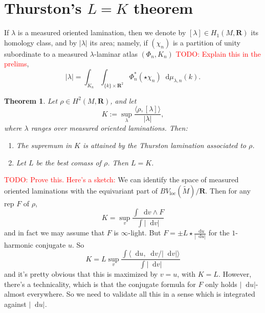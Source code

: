\documentclass[reqno,11pt]{amsart}
\newcommand{\RR}{\mathbf{R}}
\newcommand*\dif{\mathop{}\!\mathrm{d}}
\newcommand{\loc}{\mathrm{loc}}
\newtheorem{theorem}{Theorem}[section]
\theoremstyle{definition}
\numberwithin{equation}{section}
\newcommand\todo[1]{\textcolor{red}{TODO: #1}}
\begin{document}
\section{Thurston's \texorpdfstring{$L = K$}{L equals K} theorem}
If $\lambda$ is a measured oriented lamination, then we denote by $[\lambda] \in H_1(M, \RR)$ its homology class, and by $|\lambda|$ its area; namely, if $(\chi_n)$ is a partition of unity subordinate to a measured $\lambda$-laminar atlas $(\Phi_n, K_n)$ \todo{Explain this in the prelims},
$$|\lambda| = \int_{K_n} \int_{\{k\} \times \RR^2} \Phi_n^*(\star \chi_n) \dif \mu_{\lambda, n}(k).$$

\begin{theorem}
	Let $\rho \in H^2(M, \RR)$, and let 
	$$K := \sup_\lambda \frac{\langle \rho, [\lambda]\rangle}{|\lambda|},$$
	where $\lambda$ ranges over measured oriented laminations. Then:
\begin{enumerate}
	\item The supremum in $K$ is attained by the Thurston lamination associated to $\rho$.
	\item Let $L$ be the best comass of $\rho$. Then $L = K$.
\end{enumerate}
\end{theorem}

\todo{Prove this. Here's a sketch:}
We can identify the space of measured oriented laminations with the equivariant part of $BV_\loc(\tilde M)/\RR$.
Then for any rep $F$ of $\rho$,
$$K = \sup_v \frac{\int \dif v \wedge F}{\int |\dif v|}$$
and in fact we may assume that $F$ is $\infty$-light.
But $F = \pm L \star \frac{\dif u}{|\dif u|}$ for the $1$-harmonic conjugate $u$.
So 
$$K = L \sup_v \frac{\int \langle \dif u, \dif v/|\dif v|\rangle}{\int |\dif v|}$$
and it's pretty obvious that this is maximized by $v = u$, with $K = L$.
However, there's a technicality, which is that the conjugate formula for $F$ only holds $|\dif u|$-almost everywhere.
So we need to validate all this in a sense which is integrated against $|\dif u|$.

\printbibliography
\end{document}
